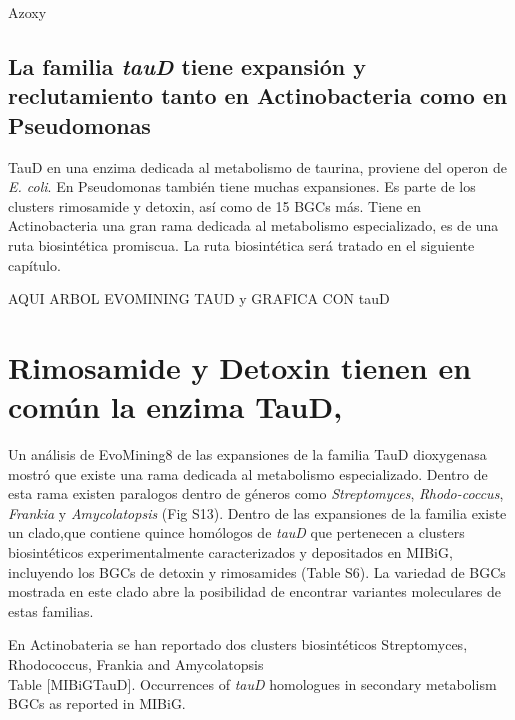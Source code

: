 \documentclass[12pt,twoside]{reedthesis}
\begin{document}
  Azoxy
  
  \subsection{\texorpdfstring{La familia \emph{tauD} tiene expansión y
  reclutamiento tanto en Actinobacteria como en
  Pseudomonas}{La familia tauD tiene expansión y reclutamiento tanto en Actinobacteria como en Pseudomonas}}\label{la-familia-taud-tiene-expansion-y-reclutamiento-tanto-en-actinobacteria-como-en-pseudomonas}
  
  TauD en una enzima dedicada al metabolismo de taurina, proviene del
  operon de \emph{E. coli}. En Pseudomonas también tiene muchas
  expansiones. Es parte de los clusters rimosamide y detoxin, así como de
  15 BGCs más. Tiene en Actinobacteria una gran rama dedicada al
  metabolismo especializado, es de una ruta biosintética promiscua. La
  ruta biosintética será tratado en el siguiente capítulo.
  
  AQUI ARBOL EVOMINING TAUD y GRAFICA CON tauD
  
  \section{Rimosamide y Detoxin tienen en común la enzima
  TauD,}\label{rimosamide-y-detoxin-tienen-en-comun-la-enzima-taud}
  
  Un análisis de EvoMining8 de las expansiones de la familia TauD
  dioxygenasa mostró que existe una rama dedicada al metabolismo
  especializado. Dentro de esta rama existen paralogos dentro de géneros
  como \emph{Streptomyces}, \emph{Rhodo-coccus}, \emph{Frankia} y
  \emph{Amycolatopsis} (Fig S13). Dentro de las expansiones de la familia
  existe un clado,que contiene quince homólogos de \emph{tauD} que
  pertenecen a clusters biosintéticos experimentalmente caracterizados y
  depositados en MIBiG, incluyendo los BGCs de detoxin y rimosamides
  (Table S6). La variedad de BGCs mostrada en este clado abre la
  posibilidad de encontrar variantes moleculares de estas familias.
  
  En Actinobateria se han reportado dos clusters biosintéticos
  Streptomyces, Rhodococcus, Frankia and Amycolatopsis\\
  Table {[}MIBiGTauD{]}. Occurrences of \emph{tauD} homologues in
  secondary metabolism BGCs as reported in MIBiG.
  
\end{document}
